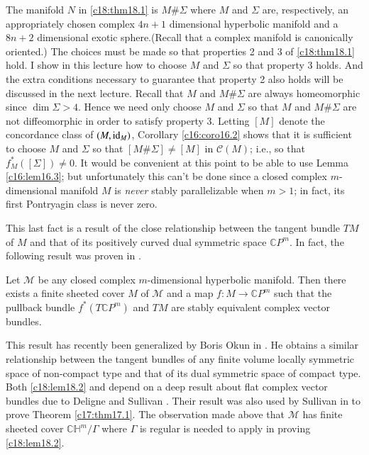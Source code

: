 The manifold $N$ in \ref{c18:thm18.1} is $M\# \Sigma$ where $M$ and
$\Sigma$ are, respectively, an appropriately chosen complex $4n+1$
dimensional hyperbolic manifold and a $8n+2$ dimensional exotic
sphere.\pageoriginale (Recall that a complex manifold is canonically
oriented.) The choices must be made so that properties 2 and 3 of
\ref{c18:thm18.1} hold. I show in this lecture how to choose $M$ and
$\Sigma$ so that property 3 holds. And the extra conditions necessary
to guarantee that property 2 also holds will be discussed in the next
lecture. Recall that $M$ and $M\# \Sigma$ are always homeomorphic
since $\dim \Sigma>4$. Hence we need only choose $M$ and $\Sigma$ so
that $M$ and $M\# \Sigma$ are not diffeomorphic in order to satisfy
property 3. Letting $[M]$ denote the concordance class of
$(M,\operatorname{id}_{M})$, Corollary \ref{c16:coro16.2} shows that it is
sufficient to choose $M$ and $\Sigma$ so that $[M\# \Sigma]\neq [M]$
in $\mathcal{C}(M)$; i.e., so that $f^{\ast}_{M}([\Sigma])\neq 0$. It
would be convenient at this point to be able to use Lemma
\ref{c16:lem16.3}; but unfortunately this can't be done since a closed
complex $m$-dimensional manifold $M$ is {\em never} stably
parallelizable when $m>1$; in fact, its first Pontryagin class is
never zero.

This last fact is a result of the close relationship between the
tangent bundle $TM$ of $M$ and that of its positively curved dual
symmetric space $\mathbb{C}P^{m}$. In fact, the following result was
proven in \cite[\S 3]{46}. 

\begin{lemma}\label{c18:lem18.2}
Let $\mathcal{M}$ be any closed complex $m$-dimensional hyperbolic
manifold. Then there exists a finite sheeted cover $M$ of
$\mathcal{M}$ and a map $f:M\to \mathbb{C}P^{m}$ such that the
pullback bundle $f^{*}(T\mathbb{C}P^{m})$ and $TM$ are stably
equivalent complex vector bundles.
\end{lemma}

\begin{remark*}
This result has recently been generalized by Boris Okun in
\cite{80}. He obtains a similar relationship between the tangent
bundles of any finite volume locally symmetric space of non-compact
type and that of its dual symmetric space of compact type. Both
\ref{c18:lem18.2} and \cite{80} depend on a deep result about flat
complex vector bundles due to Deligne and Sullivan \cite{25}. Their
result was also used by Sullivan in \cite{94} to prove Theorem
\ref{c17:thm17.1}. The observation made above that $\mathcal{M}$ has
finite sheeted cover $\mathbb{CH}^{m}/\Gamma$ where $\Gamma$ is
regular is needed to apply \cite{25} in proving \ref{c18:lem18.2}.
\end{remark*}


